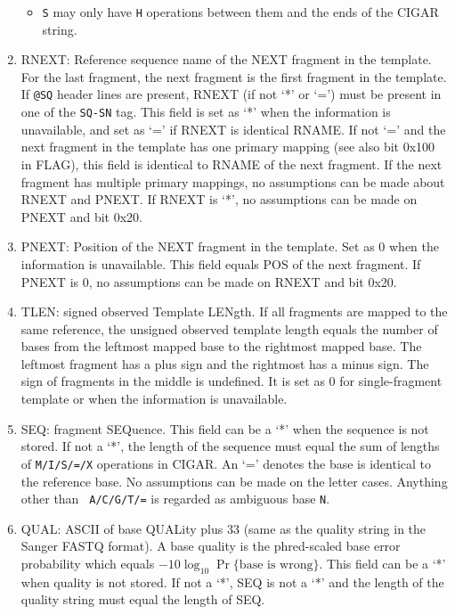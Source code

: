 \documentclass[10pt]{article}
\begin{document}
\begin{enumerate}
\begin{itemize}
  \item {\tt S} may only have {\tt H} operations between them and the
    ends of the {\sf CIGAR} string.
  \end{itemize}
\item {\sf RNEXT}: Reference sequence name of the NEXT fragment in the
  template. For the last fragment, the next fragment is the first
  fragment in the template. If {\tt @SQ} header lines are present, {\sf
    RNEXT} (if not `*' or `=') must be present in one of the {\tt SQ-SN}
  tag. This field is set as `*' when the information is unavailable, and
  set as `=' if {\sf RNEXT} is identical {\sf RNAME}. If not `=' and the
  next fragment in the template has one primary mapping (see also bit
  0x100 in {\sf FLAG}), this field is identical to {\sf RNAME} of the
  next fragment.  If the next fragment has multiple primary mappings, no
  assumptions can be made about {\sf RNEXT} and {\sf PNEXT}.  If {\sf
    RNEXT} is `*', no assumptions can be made on {\sf PNEXT} and bit
  0x20.
\item {\sf PNEXT}: Position of the NEXT fragment in the template. Set as
  0 when the information is unavailable. This field equals {\sf POS} of
  the next fragment. If {\sf PNEXT} is 0, no assumptions can be made on
  {\sf RNEXT} and bit 0x20.
\item {\sf TLEN}: signed observed Template LENgth. If all fragments are
  mapped to the same reference, the unsigned observed template length
  equals the number of bases from the leftmost mapped base to the
  rightmost mapped base. The leftmost fragment has a plus sign and the
  rightmost has a minus sign. The sign of fragments in the middle is
  undefined. It is set as 0 for single-fragment template or when the
  information is unavailable.
\item {\sf SEQ}: fragment SEQuence. This field can be a `*' when the
  sequence is not stored. If not a `*', the length of the sequence must
  equal the sum of lengths of {\tt M/I/S/=/X} operations in {\sf CIGAR}.
  An `=' denotes the base is identical to the reference base. No
  assumptions can be made on the letter cases. Anything other than {\tt
    A/C/G/T/=} is regarded as ambiguous base {\tt N}.
\item {\sf QUAL}: ASCII of base QUALity plus 33 (same as the quality
  string in the Sanger FASTQ format). A base quality is the phred-scaled
  base error probability which equals $-10\log_{10}\Pr\{\mbox{base is
    wrong}\}$. This field can be a `*' when quality is not stored. If
  not a `*', {\sf SEQ} is not a `*' and the length of the quality string
  must equal the length of {\sf SEQ}.
\end{enumerate}
\end{document}
